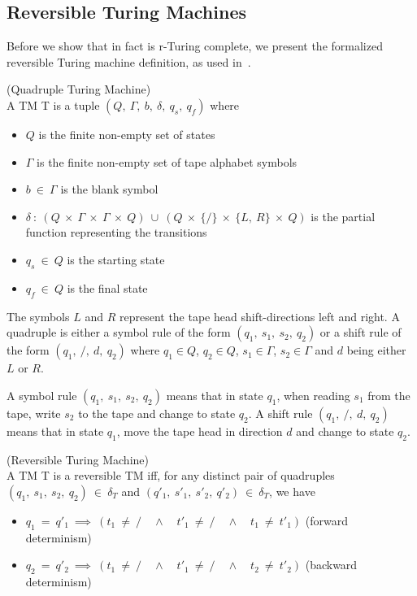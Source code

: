 \subsection{Reversible Turing Machines}
\label{subsec:reversible-turing-machine}
Before we show that \rooplpp in fact is r-Turing complete, we present the formalized reversible Turing machine definition, as used in~\cite{ty:ejanus}.
\vspace{4mm}
\begin{definition}
    \label{def:quadruple-tm}(Quadruple Turing Machine)\vspace{4mm}\\
    \noindent A TM T is a tuple $(Q,\ \Gamma,\ b,\ \delta,\ q_s,\ q_f)$ where
    \begin{itemize}[label = {}, itemsep = 1pt]
        \item $Q$ is the finite non-empty set of states
        \item $\Gamma$ is the finite non-empty set of tape alphabet symbols
        \item $b\ \in\ \Gamma$ is the blank symbol
        \item $\delta\ :\ (Q\ \times\ \Gamma\ \times\ \Gamma\ \times\ Q)\ \cup\ (Q\ \times\ \{/\}\ \times\ \{L,\ R\}\ \times\ Q)$ is the partial function representing the transitions
        \item $q_s\ \in\ Q$ is the starting state
        \item $q_f\ \in\ Q$ is the final state
    \end{itemize}
    The symbols $L$ and $R$ represent the tape head shift-directions left and right. A quadruple is either a symbol rule of the form $(q_1,\ s_1,\ s_2,\ q_2)$ or a shift rule of the form $(q_1,\ /,\ d,\ q_2)$ where $q_1 \in Q$, $q_2 \in Q$, $s_1 \in \Gamma$, $s_2 \in \Gamma$ and $d$ being either $L$ or $R$.
    
    A symbol rule $(q_1,\ s_1,\ s_2,\ q_2)$ means that in state $q_1$, when reading $s_1$ from the tape, write $s_2$ to the tape and change to state $q_2$. A shift rule $(q_1,\ /,\ d,\ q_2)$ means that in state $q_1$, move the tape head in direction $d$ and change to state $q_2$.
\end{definition}
\vspace{4mm}
\begin{definition}
    \label{def:reversible-tm}(Reversible Turing Machine)\vspace{4mm}\\
    \noindent A TM T is a reversible TM iff, for any distinct pair of quadruples $(q_1,\ s_1,\ s_2,\ q_2)\ \in\ \delta_T$ and $(q'_1,\ s'_1,\ s'_2,\ q'_2)\ \in\ \delta_T$, we have
    \begin{itemize}[label = {}, itemsep = 1pt]
        \item $q_1\ =\ q'_1\ \implies\ (t_1\ \neq\ / \quad \wedge \quad t'_1\ \neq\ / \quad \wedge \quad t_1\ \neq\ t'_1)$ (forward determinism)
        \item $q_2\ =\ q'_2\ \implies\ (t_1\ \neq\ / \quad \wedge \quad t'_1\ \neq\ / \quad \wedge \quad t_2\ \neq\ t'_2)$ (backward determinism)
    \end{itemize}
\end{definition}

